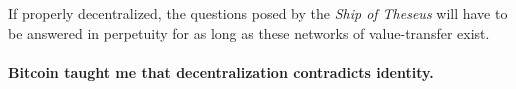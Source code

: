 If properly decentralized, the questions posed by the \textit{Ship of Theseus}
will have to be answered in perpetuity for as long as these networks of
value-transfer exist.

\paragraph{Bitcoin taught me that decentralization contradicts identity.}

%
%
%
%
